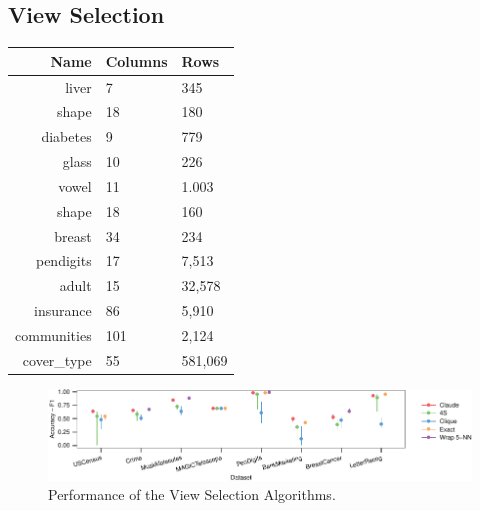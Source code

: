 \subsection{View Selection}
\begin{table}[t!]
\centering
\begin{tabular}{rll}
  \hline
  Name & Columns & Rows \\ 
  \hline
  liver & 7 & 345\\
  shape & 18 & 180\\
  diabetes & 9 & 779\\
  glass & 10 & 226\\
  vowel & 11 & 1.003\\
  shape & 18 & 160\\
  breast & 34 & 234\\
  pendigits & 17 & 7,513\\
  adult & 15 & 32,578\\
  insurance & 86 & 5,910\\ 
  communities & 101 & 2,124\\
  cover\_type & 55 & 581,069\\
   \hline
\end{tabular}
\label{table:datasets}
\end{table}

\begin{figure}[t!]
\centering
\includegraphics[width=2\columnwidth]{plots/view-scores}
\caption{Performance of the View Selection Algorithms.}
\label{pic:column-select-score}
\end{figure}

